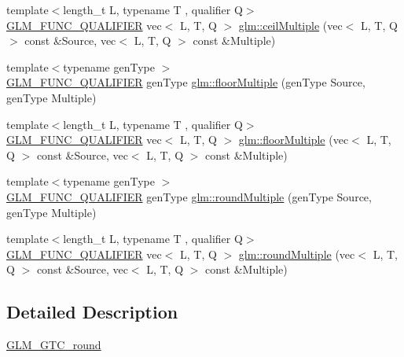 \begin{DoxyCompactItemize}
\item 
{\footnotesize template$<$length\+\_\+t L, typename T , qualifier Q$>$ }\\\hyperlink{setup_8hpp_a33fdea6f91c5f834105f7415e2a64407}{G\+L\+M\+\_\+\+F\+U\+N\+C\+\_\+\+Q\+U\+A\+L\+I\+F\+I\+ER} vec$<$ L, T, Q $>$ \hyperlink{group__gtc__round_gab77fdcc13f8e92d2e0b1b7d7aeab8e9d}{glm\+::ceil\+Multiple} (vec$<$ L, T, Q $>$ const \&Source, vec$<$ L, T, Q $>$ const \&Multiple)
\item 
{\footnotesize template$<$typename gen\+Type $>$ }\\\hyperlink{setup_8hpp_a33fdea6f91c5f834105f7415e2a64407}{G\+L\+M\+\_\+\+F\+U\+N\+C\+\_\+\+Q\+U\+A\+L\+I\+F\+I\+ER} gen\+Type \hyperlink{group__gtc__round_ga2ffa3cd5f2ea746ee1bf57c46da6315e}{glm\+::floor\+Multiple} (gen\+Type Source, gen\+Type Multiple)
\item 
{\footnotesize template$<$length\+\_\+t L, typename T , qualifier Q$>$ }\\\hyperlink{setup_8hpp_a33fdea6f91c5f834105f7415e2a64407}{G\+L\+M\+\_\+\+F\+U\+N\+C\+\_\+\+Q\+U\+A\+L\+I\+F\+I\+ER} vec$<$ L, T, Q $>$ \hyperlink{group__gtc__round_gacdd8901448f51f0b192380e422fae3e4}{glm\+::floor\+Multiple} (vec$<$ L, T, Q $>$ const \&Source, vec$<$ L, T, Q $>$ const \&Multiple)
\item 
{\footnotesize template$<$typename gen\+Type $>$ }\\\hyperlink{setup_8hpp_a33fdea6f91c5f834105f7415e2a64407}{G\+L\+M\+\_\+\+F\+U\+N\+C\+\_\+\+Q\+U\+A\+L\+I\+F\+I\+ER} gen\+Type \hyperlink{group__gtc__round_gab892defcc9c0b0618df7251253dc0fbb}{glm\+::round\+Multiple} (gen\+Type Source, gen\+Type Multiple)
\item 
{\footnotesize template$<$length\+\_\+t L, typename T , qualifier Q$>$ }\\\hyperlink{setup_8hpp_a33fdea6f91c5f834105f7415e2a64407}{G\+L\+M\+\_\+\+F\+U\+N\+C\+\_\+\+Q\+U\+A\+L\+I\+F\+I\+ER} vec$<$ L, T, Q $>$ \hyperlink{group__gtc__round_ga2f1a68332d761804c054460a612e3a4b}{glm\+::round\+Multiple} (vec$<$ L, T, Q $>$ const \&Source, vec$<$ L, T, Q $>$ const \&Multiple)
\end{DoxyCompactItemize}


\subsection{Detailed Description}
\hyperlink{group__gtc__round}{G\+L\+M\+\_\+\+G\+T\+C\+\_\+round} 